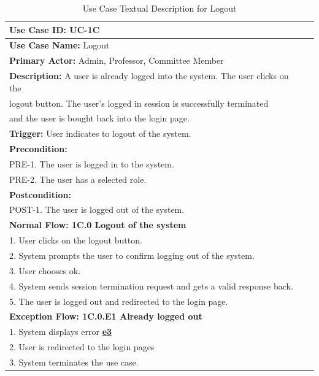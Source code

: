 \documentclass[fontsize=12pt,paper=letter,twoside]{scrartcl}
\begin{document}
\begin{table}[!htb]
\begin{center}
\begin{tabular}{|l|l|}
\hline
\textbf{Use Case ID:} UC-1C \\ \hline
\textbf{Use Case Name:} Logout \\ \hline
\textbf {Primary Actor:} Admin, Professor, Committee Member\\ \hline
\textbf{Description:} A user is already logged into the system. The user clicks on the \\logout button. The user's logged in session is successfully terminated \\and the user is bought back into the login page. \\ \hline
\textbf{Trigger:} User indicates to logout of the system.\\ \hline
\textbf{Precondition:}
\\ PRE-1. The user is logged in to the system.
\\ PRE-2. The user has a selected role. \\ \hline
\textbf{Postcondition:}
\\ POST-1. The user is logged out of the system. \\ \hline
\textbf{Normal Flow: 1C.0 Logout of the system}
\\ 1. User clicks on the logout button.
\\ 2. System prompts the user to confirm logging out of the system.
\\ 3. User chooses ok.
\\ 4. System sends session termination request and gets a valid response back.
\\ 5. The user is logged out and redirected to the login page.\\ \hline
\textbf{Exception Flow: 1C.0.E1 Already logged out}
\\ 1. System displays error \hyperref[app:error]{\textbf{e3}}
\\ 2. User is redirected to the login pages
\\ 3. System terminates the use case.\\ \hline
\end{tabular}
\end{center}
\caption {Use Case Textual Description for Logout}
\label{tbl:uc1Ctd}
\end{table}

\clearpage
\newpage
\end{document}
